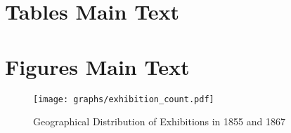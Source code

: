 \appendix

\section{Tables Main Text}
\clearpage

\clearpage

\clearpage
%
\clearpage
%
\clearpage
%
\clearpage
%

\clearpage
\section{Figures Main Text}

\begin{figure}
    \centering
    \texttt{[image: graphs/exhibition\_count.pdf]}
    \caption{Geographical Distribution of Exhibitions in 1855 and 1867}
    \label{fig:exhibition_count}
\end{figure}


